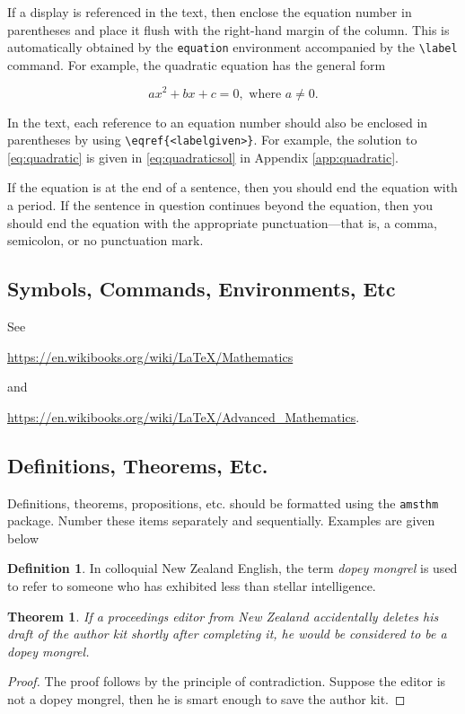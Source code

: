\documentclass[a4paper,11pt]{article}
\theoremstyle{plain}
\newtheorem{theorem}{Theorem}
\theoremstyle{definition}
\newtheorem{definition}{Definition}
\begin{document}
If a display is referenced in the text, then enclose the equation number
in parentheses and place it flush with the right-hand margin of the
column. This is automatically obtained by the \texttt{equation} environment
accompanied by the \verb+\label+ command.
For example, the quadratic equation has the general form

\begin{equation} \label{eq:quadratic}
ax^2 + bx + c = 0, \mbox{ where } a \ne 0.
\end{equation}

In the text, each reference to an equation number should also be enclosed in
parentheses by using \verb+\eqref{<labelgiven>}+.
For example, the solution to \eqref{eq:quadratic} is given
in \eqref{eq:quadraticsol} in Appendix \ref{app:quadratic}.

If the equation is at the end of a sentence, then you should end the equation
with a period. If the sentence in question continues beyond the equation,
then you should end the equation with the appropriate
punctuation---that is, a comma, semicolon, or no punctuation mark.

\subsection{Symbols, Commands, Environments, Etc}
See

\url{https://en.wikibooks.org/wiki/LaTeX/Mathematics}

\noindent
and

\url{https://en.wikibooks.org/wiki/LaTeX/Advanced_Mathematics}.


\subsection{Definitions, Theorems, Etc.}
Definitions, theorems, propositions, etc. should be formatted
using the \texttt{amsthm} package.
Number these items separately and sequentially. Examples are given below

\begin{definition}
In colloquial New Zealand English, the term \textit{dopey mongrel} is used
to refer to someone who has exhibited less than stellar intelligence.
\end{definition}

\begin{theorem}\label{t:delete}
If a proceedings editor from New Zealand accidentally deletes his draft of
the author kit shortly after completing it, he would be considered to be a dopey mongrel.
\end{theorem}
\begin{proof}
The proof follows by the principle of contradiction.
Suppose the editor is not a dopey mongrel, then he is smart enough to save
the author kit.
\end{proof}
\end{document}

